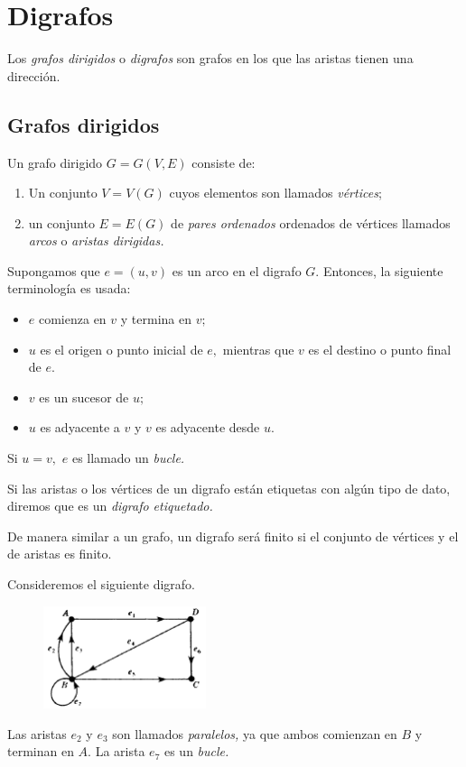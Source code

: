 \section{Digrafos}


Los \emph{grafos dirigidos} o \emph{digrafos} son grafos en los que las aristas tienen una direcci\'on.


\subsection{Grafos dirigidos}


Un grafo dirigido $G=G(V,E)$ consiste de:
\begin{enumerate}
	\item Un conjunto $V=V(G)$ cuyos elementos son llamados \emph{v\'ertices};
	\item un conjunto $E=E(G)$ de \emph{pares ordenados} ordenados de v\'ertices llamados \emph{arcos} o \emph{aristas dirigidas.}
\end{enumerate}




Supongamos que $e=(u,v)$ es un arco en el digrafo $G.$ Entonces, la siguiente terminolog\'ia es usada:
\begin{itemize}
	\item $e$ comienza en $v$ y termina en $v;$
	\item $u$ es el origen o punto inicial de $e,$ mientras que $v$ es el destino o punto final de $e.$
	\item $v$ es un sucesor de $u;$
	\item $u$ es adyacente a $v$ y $v$ es adyacente desde $u.$
\end{itemize}


Si $u=v,$ $e$ es llamado un \emph{bucle.}



Si las aristas o los v\'ertices de un digrafo est\'an etiquetas con alg\'un tipo de dato, diremos que es un \emph{digrafo etiquetado.}


De manera similar a un grafo, un digrafo ser\'a finito si el conjunto de v\'ertices y el de aristas es finito.



\begin{exmp}
	Consideremos el siguiente digrafo.
	\begin{figure}[h]
		\centering
		\includegraphics[height=3cm,keepaspectratio=true]{./md/fig0901a.png}
		\label{fig:0901a}
	\end{figure}
	Las aristas $e_{2}$ y $e_{3}$ son llamados \emph{paralelos,} ya que ambos comienzan en $B$ y terminan en $A.$ La arista $e_{7}$ es un \emph{bucle.}
\end{exmp}




